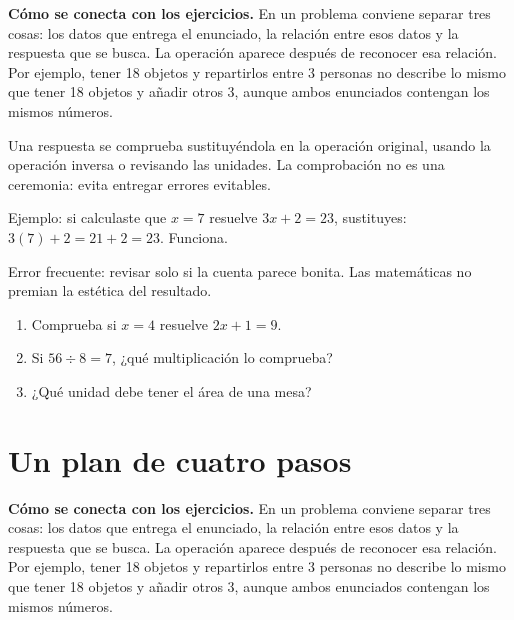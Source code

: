 \documentclass[10pt,oneside,openany]{book}
\begin{document}
\textbf{Cómo se conecta con los ejercicios.} En un problema conviene separar tres cosas: los datos que entrega el enunciado, la relación entre esos datos y la respuesta que se busca. La operación aparece después de reconocer esa relación. Por ejemplo, tener 18 objetos y repartirlos entre 3 personas no describe lo mismo que tener 18 objetos y añadir otros 3, aunque ambos enunciados contengan los mismos números.

Una respuesta se comprueba sustituyéndola en la operación original, usando la operación inversa o revisando las unidades. La comprobación no es una ceremonia: evita entregar errores evitables.

\begin{ejemplo}
Ejemplo: si calculaste que $x=7$ resuelve $3x+2=23$, sustituyes: $3(7)+2=21+2=23$. Funciona.
\end{ejemplo}

\begin{ojo}
Error frecuente: revisar solo si la cuenta parece bonita. Las matemáticas no premian la estética del resultado.
\end{ojo}

\begin{practica}

\begin{enumerate}

\item Comprueba si $x=4$ resuelve $2x+1=9$.

\item Si $56\div8=7$, ¿qué multiplicación lo comprueba?

\item ¿Qué unidad debe tener el área de una mesa?

\end{enumerate}

\end{practica}



\section{Un plan de cuatro pasos}

\textbf{Cómo se conecta con los ejercicios.} En un problema conviene separar tres cosas: los datos que entrega el enunciado, la relación entre esos datos y la respuesta que se busca. La operación aparece después de reconocer esa relación. Por ejemplo, tener 18 objetos y repartirlos entre 3 personas no describe lo mismo que tener 18 objetos y añadir otros 3, aunque ambos enunciados contengan los mismos números.
\end{document}
